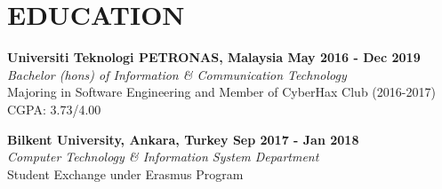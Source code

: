 \vspace{0.3cm}
\section{EDUCATION}

\textbf{Universiti Teknologi PETRONAS, Malaysia
\hfill{May 2016 - Dec 2019}} \vspace{0.1cm} \\
{\sl Bachelor (hons) of Information \& Communication Technology} \vspace{0.1cm} \\
\hfill Majoring in Software Engineering and Member of CyberHax Club (2016-2017) \vspace{0.15cm} \\
\hfill CGPA: 3.73/4.00

\textbf{Bilkent University, Ankara, Turkey
\hfill{Sep 2017 - Jan 2018}} \vspace{0.1cm} \\
{\sl Computer Technology \& Information System Department} \vspace{0.1cm} \\
\hfill Student Exchange under Erasmus Program \\

